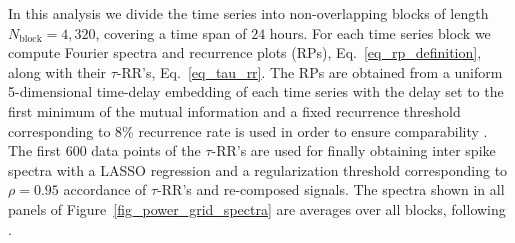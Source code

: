 \documentclass[entropy,article,submit,pdftex,moreauthors]{Definitions/mdpi}
\begin{document}
In this analysis we divide the time series into 
non-overlapping blocks of length $N_{\text{block}}=4,320$, covering a time span of $24$ hours. For each time series block we compute Fourier spectra and recurrence plots (RPs), 
Eq.~\eqref{eq_rp_definition}, along with their $\tau$-RR's, Eq.~\ref{eq_tau_rr}. The RPs are obtained from a uniform 5-dimensional time-delay embedding of each time series with 
the delay set to the first minimum of the mutual information \cite{fraser1986,hegger1999} and a fixed recurrence threshold corresponding to 8\% recurrence rate is used in order 
to ensure comparability \cite{kraemer2018}. The first $600$ data points of the $\tau$-RR's are used for finally obtaining inter spike spectra with a LASSO regression and a 
regularization threshold corresponding to $\rho=0.95$ accordance of $\tau$-RR's and re-composed signals. The spectra shown in all panels of Figure~\ref{fig_power_grid_spectra} 
are averages over all blocks, following \citet{meyer2020identifying}.
\end{document}
